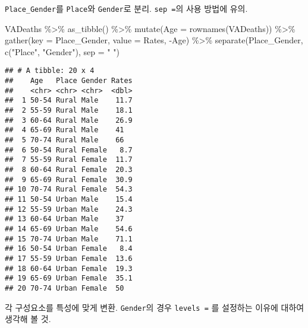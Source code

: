 \documentclass[
]{article}
\newenvironment{Shaded}{\begin{snugshade}}{\end{snugshade}}
\newcommand{\AttributeTok}[1]{\textcolor[rgb]{0.77,0.63,0.00}{#1}}
\newcommand{\FunctionTok}[1]{\textcolor[rgb]{0.00,0.00,0.00}{#1}}
\newcommand{\NormalTok}[1]{#1}
\newcommand{\SpecialCharTok}[1]{\textcolor[rgb]{0.00,0.00,0.00}{#1}}
\newcommand{\StringTok}[1]{\textcolor[rgb]{0.31,0.60,0.02}{#1}}
\begin{document}
\texttt{Place\_Gender}를 \texttt{Place}와 \texttt{Gender}로 분리.
\texttt{sep\ =}의 사용 방법에 유의.

\begin{Shaded}
\begin{Highlighting}[]
\NormalTok{VADeaths }\SpecialCharTok{\%\textgreater{}\%}
  \FunctionTok{as\_tibble}\NormalTok{() }\SpecialCharTok{\%\textgreater{}\%}
  \FunctionTok{mutate}\NormalTok{(}\AttributeTok{Age =} \FunctionTok{rownames}\NormalTok{(VADeaths)) }\SpecialCharTok{\%\textgreater{}\%}
  \FunctionTok{gather}\NormalTok{(}\AttributeTok{key =}\NormalTok{ Place\_Gender, }
         \AttributeTok{value =}\NormalTok{ Rates,}
         \SpecialCharTok{{-}}\NormalTok{Age) }\SpecialCharTok{\%\textgreater{}\%}
  \FunctionTok{separate}\NormalTok{(Place\_Gender, }\FunctionTok{c}\NormalTok{(}\StringTok{"Place"}\NormalTok{, }\StringTok{"Gender"}\NormalTok{), }
           \AttributeTok{sep =} \StringTok{" "}\NormalTok{)}
\end{Highlighting}
\end{Shaded}

\begin{verbatim}
## # A tibble: 20 x 4
##    Age   Place Gender Rates
##    <chr> <chr> <chr>  <dbl>
##  1 50-54 Rural Male    11.7
##  2 55-59 Rural Male    18.1
##  3 60-64 Rural Male    26.9
##  4 65-69 Rural Male    41  
##  5 70-74 Rural Male    66  
##  6 50-54 Rural Female   8.7
##  7 55-59 Rural Female  11.7
##  8 60-64 Rural Female  20.3
##  9 65-69 Rural Female  30.9
## 10 70-74 Rural Female  54.3
## 11 50-54 Urban Male    15.4
## 12 55-59 Urban Male    24.3
## 13 60-64 Urban Male    37  
## 14 65-69 Urban Male    54.6
## 15 70-74 Urban Male    71.1
## 16 50-54 Urban Female   8.4
## 17 55-59 Urban Female  13.6
## 18 60-64 Urban Female  19.3
## 19 65-69 Urban Female  35.1
## 20 70-74 Urban Female  50
\end{verbatim}

각 구성요소를 특성에 맞게 변환. \texttt{Gender}의 경우
\texttt{levels\ =} 를 설정하는 이유에 대하여 생각해 볼 것.
\end{document}

